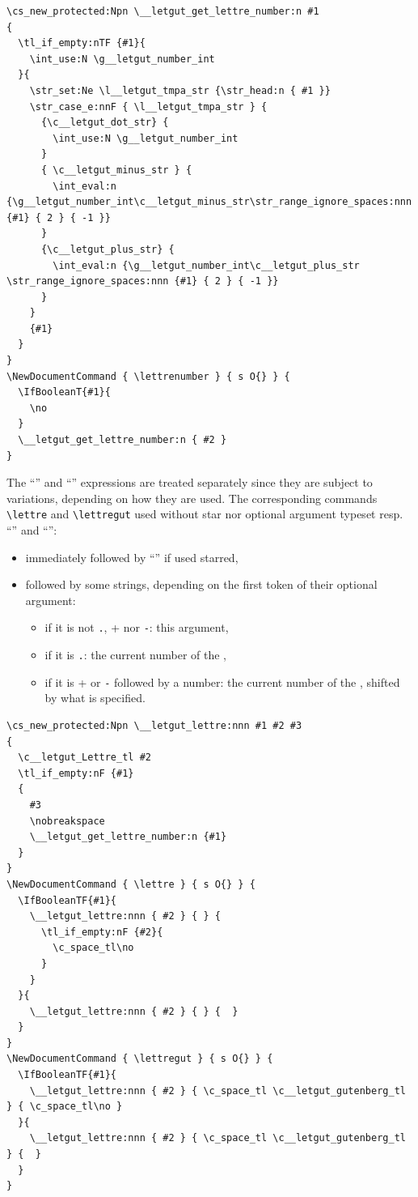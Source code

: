 \documentclass{letgut}
\begin{document}
\begin{lstlisting}
\cs_new_protected:Npn \__letgut_get_lettre_number:n #1
{
  \tl_if_empty:nTF {#1}{
    \int_use:N \g__letgut_number_int
  }{
    \str_set:Ne \l__letgut_tmpa_str {\str_head:n { #1 }}
    \str_case_e:nnF { \l__letgut_tmpa_str } {
      {\c__letgut_dot_str} {
        \int_use:N \g__letgut_number_int
      }
      { \c__letgut_minus_str } {
        \int_eval:n {\g__letgut_number_int\c__letgut_minus_str\str_range_ignore_spaces:nnn {#1} { 2 } { -1 }}
      }
      {\c__letgut_plus_str} {
        \int_eval:n {\g__letgut_number_int\c__letgut_plus_str \str_range_ignore_spaces:nnn {#1} { 2 } { -1 }}
      }
    }
    {#1}
  }
}
\NewDocumentCommand { \lettrenumber } { s O{} } {
  \IfBooleanT{#1}{
    \no
  }
  \__letgut_get_lettre_number:n { #2 }
}
\end{lstlisting}

The “” and “” expressions are treated separately since they are
subject to variations, depending on how they are used. The corresponding commands
\lstinline+\lettre+ and \lstinline+\lettregut+ used without star nor optional argument typeset
resp. “” and “”:

\begin{itemize}
\item immediately followed by “\no” if used starred,
\item followed by some strings, depending on the first token of their optional
argument:
\begin{itemize}
\item if it is not \lstinline+.+, \lstinline+++ nor \lstinline+-+: this argument,
\item if it is \lstinline+.+: the current number of the ,
\item if it is \lstinline+++ or \lstinline+-+ followed by a number: the current number of the ,
shifted by what is specified.
\end{itemize}
\end{itemize}

\begin{lstlisting}
\cs_new_protected:Npn \__letgut_lettre:nnn #1 #2 #3
{
  \c__letgut_Lettre_tl #2
  \tl_if_empty:nF {#1}
  {
    #3
    \nobreakspace
    \__letgut_get_lettre_number:n {#1}
  }
}
\NewDocumentCommand { \lettre } { s O{} } {
  \IfBooleanTF{#1}{
    \__letgut_lettre:nnn { #2 } { } {
      \tl_if_empty:nF {#2}{
        \c_space_tl\no
      }
    }
  }{
    \__letgut_lettre:nnn { #2 } { } {  }
  }
}
\NewDocumentCommand { \lettregut } { s O{} } {
  \IfBooleanTF{#1}{
    \__letgut_lettre:nnn { #2 } { \c_space_tl \c__letgut_gutenberg_tl } { \c_space_tl\no }
  }{
    \__letgut_lettre:nnn { #2 } { \c_space_tl \c__letgut_gutenberg_tl } {  }
  }
}
\end{lstlisting}
\end{document}
